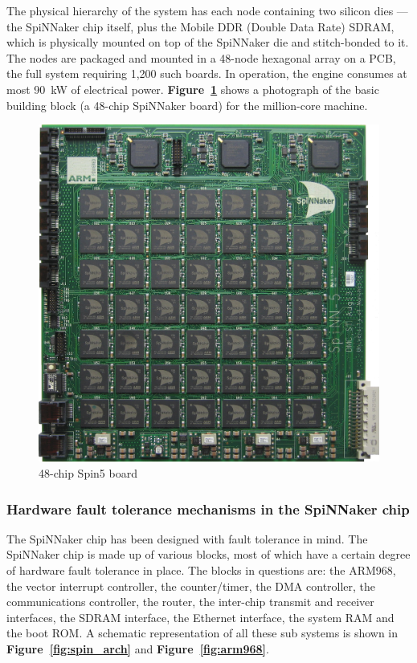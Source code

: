 \documentclass[a4paper, 11pt]{article}
\begin{document}
The physical hierarchy of the system has each node containing two silicon dies --- the SpiNNaker chip itself, plus the Mobile DDR (Double Data Rate) SDRAM, which is physically mounted on top of the SpiNNaker die and stitch-bonded to it. The nodes are packaged and mounted in a 48-node hexagonal array on a PCB, the full system requiring 1,200 such boards. In operation, the engine consumes at most 90~kW of electrical power. \textbf{Figure~\ref{fig:spin5}} shows a photograph of the basic building block (a 48-chip SpiNNaker board) for the million-core machine.

\begin{figure}[htbp]
	\centering
	\includegraphics[width=0.4\linewidth]{images/spin5.jpg}
	\caption{48-chip Spin5 board}
	\label{fig:spin5}
\end{figure}


\subsubsection{Hardware fault tolerance mechanisms in the SpiNNaker chip}
The SpiNNaker chip has been designed with fault tolerance in mind. The SpiNNaker chip is made up of various blocks, most of which have a certain degree of hardware fault tolerance in place. The blocks in questions are: the ARM968, the vector interrupt controller, the counter/timer, the DMA controller, the communications controller, the router, the inter-chip transmit and receiver interfaces, the SDRAM interface, the Ethernet interface, the system RAM and the boot ROM. A schematic representation of all these sub systems is shown in \textbf{Figure~\ref{fig:spin_arch}} and \textbf{Figure~\ref{fig:arm968}}.
\end{document}

